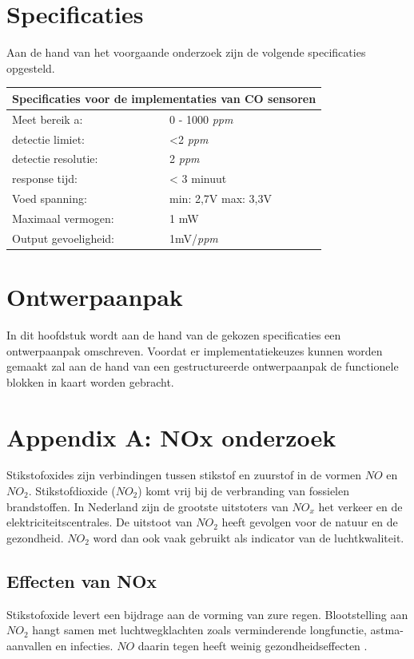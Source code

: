 \documentclass[a4paper, 11pt]{article} %
\begin{document}
\section{Specificaties}
Aan de hand van het voorgaande onderzoek zijn de volgende specificaties opgesteld. 
\begin{center}
	\begin{tabular}{ | m{5cm} | m{5cm}| } 
		\hline
		\multicolumn{2}{|c|}{Specificaties voor de implementaties van CO sensoren} \\
		\hline
		Meet bereik a: & 0 - 1000 \textit{ppm} \\
		\hline
		detectie limiet:  & <2 \textit{ppm}
		\\ 
		\hline
		detectie resolutie: & 2 \textit{ppm} 
		\\ 
		\hline
		response tijd: & < 3 minuut
		\\ 
		\hline
		Voed spanning: & min: 2,7V max: 3,3V
		\\ 
		\hline
		Maximaal vermogen: & 1 mW
		\\
		\hline
		Output gevoeligheid: & 1mV/\textit{ppm}
		\\
		\hline
	\end{tabular}
\end{center}
\newpage
\section{Ontwerpaanpak}
In dit hoofdstuk wordt aan de hand van de gekozen specificaties een ontwerpaanpak omschreven. Voordat er implementatiekeuzes kunnen worden gemaakt zal aan de hand van een gestructureerde ontwerpaanpak de functionele blokken in kaart worden gebracht. 
\subsection{}
\appendix
\section{Appendix A: NOx onderzoek}
Stikstofoxides zijn verbindingen tussen stikstof en zuurstof in de vormen $NO$ en $NO_2$. Stikstofdioxide ($NO_2$) komt vrij bij de verbranding van fossielen brandstoffen. In Nederland zijn de grootste uitstoters van $NO_x$ het verkeer en de elektriciteitscentrales.  De uitstoot van $NO_2$ heeft gevolgen voor de natuur en de gezondheid. $NO_2$ word dan ook vaak gebruikt als indicator van de luchtkwaliteit.

\subsection{Effecten van NOx}
Stikstofoxide levert een bijdrage aan de vorming van zure regen. Blootstelling aan $NO_2$ hangt samen met luchtwegklachten zoals verminderende longfunctie, astma-aanvallen en infecties. $NO$ daarin tegen heeft weinig gezondheidseffecten \cite{NO2_Amsterdam}. 
\end{document}
